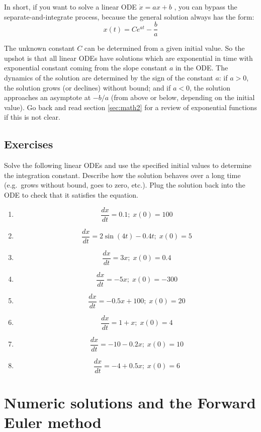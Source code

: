 \documentclass[
  letterpaper,
  DIV=11,
  numbers=noendperiod]{scrreprt}
\begin{document}
In short, if you want to solve a linear ODE \(\dot x= ax +b\) , you can
bypass the separate-and-integrate process, because the general solution
always has the form: \begin{equation}
x(t) = Ce^{at} - \frac{b}{a}
\label{eq:ch15_ode_sol}
\end{equation}

The unknown constant \(C\) can be determined from a given initial value.
So the upshot is that all linear ODEs have solutions which are
exponential in time with exponential constant coming from the slope
constant \(a\) in the ODE. The dynamics of the solution are determined
by the sign of the constant \(a\): if \(a>0\), the solution grows (or
declines) without bound; and if \(a<0\), the solution approaches an
asymptote at \(-b/a\) (from above or below, depending on the initial
value). Go back and read section \ref{sec:math2} for a review of
exponential functions if this is not clear.

\hypertarget{exercises-16}{%
\subsection{Exercises}\label{exercises-16}}

Solve the following linear ODEs and use the specified initial values to
determine the integration constant. Describe how the solution behaves
over a long time (e.g.~grows without bound, goes to zero, etc.). Plug
the solution back into the ODE to check that it satisfies the equation.

\begin{enumerate}
\def\labelenumi{\arabic{enumi}.}
\item
  \[ \frac{dx}{dt} = 0.1; \; x(0)= 100 \]
\item
  \[ \frac{dx}{dt} =  2\sin(4t) -0.4t; \; x(0)= 5 \]
\item
  \[ \frac{dx}{dt} = 3x; \; x(0) = 0.4 \]
\item
  \[ \frac{dx}{dt} = -5x; \;  x(0) = -300 \]
\item
  \[ \frac{dx}{dt} = -0.5x + 100 ; \; x(0) = 20 \]
\item
  \[ \frac{dx}{dt} =  1 + x; \; x(0) = 4 \]
\item
  \[ \frac{dx}{dt} =  -10 - 0.2x; \; x(0) = 10 \]
\item
  \[ \frac{dx}{dt} =  -4 + 0.5x; \; x(0) = 6 \]
\end{enumerate}

\hypertarget{numeric-solutions-and-the-forward-euler-method}{%
\section{Numeric solutions and the Forward Euler
method}\label{numeric-solutions-and-the-forward-euler-method}}
\end{document}

